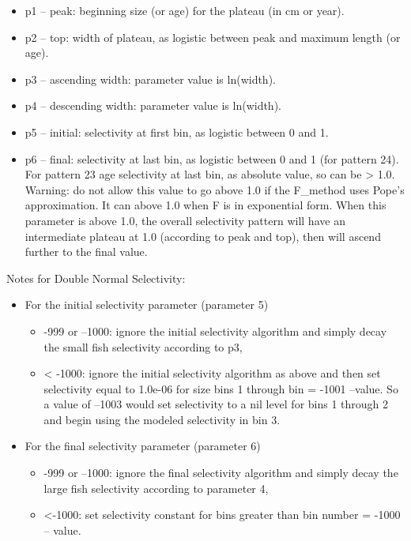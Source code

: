 	\begin{itemize}
		\item p1 – peak: beginning size (or age) for the plateau (in cm or year).
		\item p2 – top: width of plateau, as logistic between peak and maximum length (or age).
		\item p3 – ascending width:  parameter value is ln(width).
		\item p4 – descending width:  parameter value is ln(width).
		\item p5 – initial: selectivity at first bin, as logistic between 0 and 1.
		\item p6 – final: selectivity at last bin, as logistic between 0 and 1 (for pattern 24). For pattern 23 age selectivity at last bin, as absolute value, so can be > 1.0. Warning: do not allow this value to go above 1.0 if the F\_method uses Pope’s approximation. It can above 1.0 when F is in exponential form.  When this parameter is above 1.0, the overall selectivity pattern will have an intermediate plateau at 1.0 (according to peak and top), then will ascend further to the final value.
	\end{itemize}
	
Notes for Double Normal Selectivity:
	\begin{itemize}
		\item For the initial selectivity parameter (parameter 5)
		\begin{itemize}
			\item -999 or –1000:   ignore the initial selectivity algorithm and simply decay the small fish selectivity according to p3,
			\item < -1000:  ignore the initial selectivity algorithm as above and then set selectivity equal to 1.0e-06 for size bins 1 through bin =  -1001 –value.  So a value of –1003 would set selectivity to a nil level for bins 1 through 2 and begin using the modeled selectivity in bin 3.
		\end{itemize}
		\item For the final selectivity parameter (parameter 6)
		\begin{itemize}
			\item -999 or –1000:   ignore the final selectivity algorithm and simply decay the large fish selectivity according to parameter 4,
			\item <-1000:  set selectivity constant for bins greater than bin number =  -1000 – value.
		\end{itemize}
	\end{itemize}

